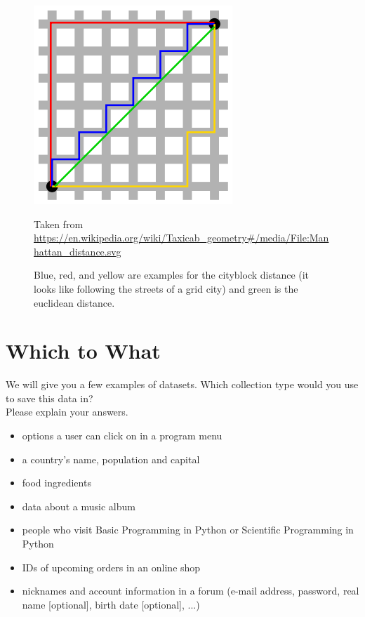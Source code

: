 \begin{figure}
  \includegraphics[scale=0.5]{metriken}
  \label{fig:metrics}
  \caption{Blue, red, and yellow are examples for the cityblock distance (it looks like following the streets of a grid city) and green is the euclidean distance.}
  \small{Taken from \url{https://en.wikipedia.org/wiki/Taxicab_geometry#/media/File:Manhattan_distance.svg}}
  
\end{figure}

\section{Which to What}
We will give you a few examples of datasets. Which collection type would you use to save this data in?\\
Please explain your answers.
\begin{itemize}
\item options a user can click on in a program menu
  \item a country's name, population and capital
  \item food ingredients
  \item data about a music album
  \item people who visit Basic Programming in Python or Scientific Programming in Python
  \item IDs of upcoming orders in an online shop
  \item nicknames and account information in a forum (e-mail address, password, real name [optional], birth date [optional], ...)
\end{itemize}

